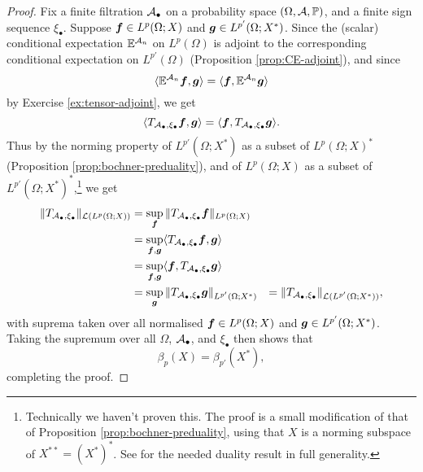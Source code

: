 \begin{proof}
  Fix a finite filtration $\mathcal{A}_{\bullet}$ on a probability space $(\Omega,\mathcal{A},\mathbb{P})$, and a finite sign sequence $\xi_{\bullet}$.
  Suppose $\bm{f} \in L^{p}(\Omega;X)$ and $\bm{g} \in L^{p'}(\Omega;X^{*})$.
  Since the (scalar) conditional expectation $\mathbb{E}^{\mathcal{A}_{n}}$ on $L^p(\Omega)$ is adjoint to the corresponding conditional expectation on $L^{p'}(\Omega)$ (Proposition \ref{prop:CE-adjoint}), and since
  \begin{equation*}
    \langle \mathbb{E}^{\mathcal{A}_{n}} \bm{f}, \bm{g} \rangle = \langle \bm{f}, \mathbb{E}^{\mathcal{A}_{n}} \bm{g} \rangle 
  \end{equation*}
  by Exercise \ref{ex:tensor-adjoint}, we get
  \begin{equation*}
    \langle T_{\mathcal{A}_{\bullet}, \xi_{\bullet}} \bm{f}, \bm{g} \rangle =  \langle \bm{f}, T_{\mathcal{A}_{\bullet}, \xi_{\bullet}} \bm{g} \rangle.
  \end{equation*}
  Thus by the norming property of $L^{p'}(\Omega;X^{*})$ as a subset of $L^{p}(\Omega;X)^{*}$ (Proposition \ref{prop:bochner-preduality}), and of $L^{p}(\Omega;X)$ as a subset of $L^{p'}(\Omega;X^{*})^{*}$,\footnote{Technically we haven't proven this. The proof is a small modification of that of Proposition \ref{prop:bochner-preduality}, using that $X$ is a norming subspace of $X^{**} = (X^{*})^{*}$. See \cite[Proposition 1.3.1]{HNVW16} for the needed duality result in full generality.}  we get
  \begin{equation*}
    \begin{aligned}
      \|T_{\mathcal{A}_{\bullet}, \xi_{\bullet}}\|_{\mathcal{L}(L^{p}(\Omega;X))}
      &= \sup_{\bm{f}} \| T_{\mathcal{A}_{\bullet}, \xi_{\bullet}} \bm{f} \|_{L^{p}(\Omega;X)} \\
      &= \sup_{\bm{f}, \bm{g}} \langle T_{\mathcal{A}_{\bullet}, \xi_{\bullet}} \bm{f}, \bm{g} \rangle \\
      &= \sup_{\bm{f}, \bm{g}} \langle  \bm{f}, T_{\mathcal{A}_{\bullet}, \xi_{\bullet}} \bm{g} \rangle \\
      &= \sup_{\bm{g}} \| T_{\mathcal{A}_{\bullet}, \xi_{\bullet}} \bm{g} \|_{L^{p'}(\Omega;X^{*})}
      &= \|T_{\mathcal{A}_{\bullet}, \xi_{\bullet}}\|_{\mathcal{L}(L^{p'}(\Omega;X^{*}))},
  \end{aligned}
\end{equation*}
with suprema taken over all normalised $\bm{f} \in L^{p}(\Omega;X)$ and $\bm{g} \in L^{p'}(\Omega;X^{*})$.
Taking the supremum over all $\Omega$, $\mathcal{A}_{\bullet}$, and $\xi_{\bullet}$ then shows that
\begin{equation*}
  \beta_{p}(X) = \beta_{p'}(X^{*}), 
\end{equation*}
completing the proof.
\end{proof}


